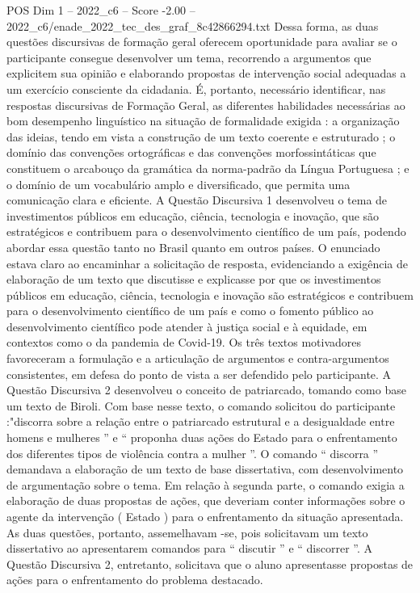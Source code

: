 \begin{textsample}{POS Dim 1 – 2022\_c6 – Score -2.00 – 2022\_c6/enade\_2022\_tec\_des\_graf\_8c42866294.txt}
Dessa forma, as duas questões discursivas de formação geral oferecem oportunidade para avaliar se o participante consegue desenvolver um tema, recorrendo a argumentos que explicitem sua opinião e elaborando propostas de intervenção social adequadas a um exercício consciente da cidadania.
É, portanto, necessário identificar, nas respostas discursivas de Formação Geral, as diferentes habilidades necessárias ao bom desempenho linguístico na situação de formalidade exigida : a organização das ideias, tendo em vista a construção de um texto coerente e estruturado ; o domínio das convenções ortográficas e das convenções morfossintáticas que constituem o arcabouço da gramática da norma-padrão da Língua Portuguesa ; e o domínio de um vocabulário amplo e diversificado, que permita uma comunicação clara e eficiente.
A Questão Discursiva 1 desenvolveu o tema de investimentos públicos em educação, ciência, tecnologia e inovação, que são estratégicos e contribuem para o desenvolvimento científico de um país, podendo abordar essa questão tanto no Brasil quanto em outros países.
O enunciado estava claro ao encaminhar a solicitação de resposta, evidenciando a exigência de elaboração de um texto que discutisse e explicasse por que os investimentos públicos em educação, ciência, tecnologia e inovação são estratégicos e contribuem para o desenvolvimento científico de um país e como o fomento público ao desenvolvimento científico pode atender à justiça social e à equidade, em contextos como o da pandemia de Covid-19.
Os três textos motivadores favoreceram a formulação e a articulação de argumentos e contra-argumentos consistentes, em defesa do ponto de vista a ser defendido pelo participante.
A Questão Discursiva 2 desenvolveu o conceito de patriarcado, tomando como base um texto de Biroli.
Com base nesse texto, o comando solicitou do participante :"discorra sobre a relação entre o patriarcado estrutural e a desigualdade entre homens e mulheres ” e “ proponha duas ações do Estado para o enfrentamento dos diferentes tipos de violência contra a mulher ”.
O comando “ discorra ” demandava a elaboração de um texto de base dissertativa, com desenvolvimento de argumentação sobre o tema.
Em relação à segunda parte, o comando exigia a elaboração de duas propostas de ações, que deveriam conter informações sobre o agente da intervenção ( Estado ) para o enfrentamento da situação apresentada.
As duas questões, portanto, assemelhavam -se, pois solicitavam um texto dissertativo ao apresentarem comandos para “ discutir ” e “ discorrer ”.
A Questão Discursiva 2, entretanto, solicitava que o aluno apresentasse propostas de ações para o enfrentamento do problema destacado.

\end{textsample}
